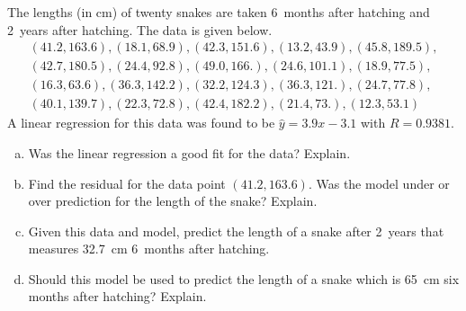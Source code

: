 \documentclass[11pt,letterpaper]{article}
\begin{document}
 The lengths (in cm) of twenty snakes are taken 6~months after hatching and 2~years after hatching. The data is given below.
	\[
	\begin{aligned}
	(41.2, 163.6), (18.1, 68.9), (42.3, 151.6), (13.2, 43.9), (45.8, 189.5), \\ 
	(42.7, 180.5), (24.4, 92.8), (49.0, 166.), (24.6, 101.1), (18.9, 77.5), \\
	(16.3, 63.6), (36.3, 142.2), (32.2, 124.3), (36.3, 121.), (24.7, 77.8), \\
	(40.1, 139.7), (22.3, 72.8), (42.4, 182.2), (21.4, 73.), (12.3, 53.1)
	\end{aligned}
	\]
A linear regression for this data was found to be $\widehat{y}= 3.9x - 3.1$ with $R= 0.9381$. 
	\begin{enumerate}[(a)]
	\item Was the linear regression a good fit for the data? Explain.
	\item Find the residual for the data point $(41.2, 163.6)$. Was the model under or over prediction for the length of the snake? Explain.
	\item Given this data and model, predict the length of a snake after 2~years that measures 32.7~cm 6~months after hatching. 
	\item Should this model be used to predict the length of a snake which is 65~cm six months after hatching? Explain. 
	\end{enumerate}
\end{document}
